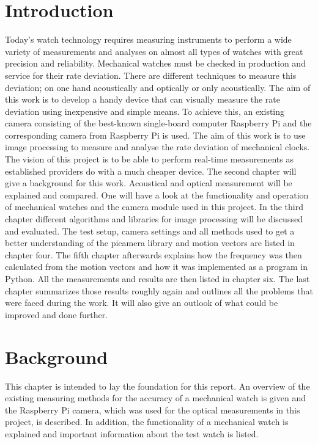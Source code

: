 \documentclass[12pt, a4paper]{report}
\begin{document}
\pagebreak
    \setcounter{secnumdepth}{5} 
    \setcounter{tocdepth}{5} 
    \tableofcontents
    \pagebreak
    
    \chapter{Introduction}
    Today's watch technology requires measuring instruments to perform a wide variety of measurements and analyses on almost all types of watches with great precision and reliability.
    Mechanical watches must be checked in production and service for their rate deviation.
    There are different techniques to measure this deviation; on one hand acoustically and optically or only acoustically.
    The aim of this work is to develop a handy device that can visually measure the rate deviation using inexpensive and simple means.
    To achieve this, an existing camera consisting of the best-known single-board computer Raspberry Pi and the corresponding camera from Raspberry Pi is used.
    The aim of this work is to use image processing to measure and analyse the rate deviation of mechanical clocks.
    The vision of this project is to be able to perform real-time measurements as established providers do with a much cheaper device. 
    \newline
    The second chapter will give a background for this work. Acoustical and optical measurement will be explained and compared. One will have a look at the functionality and operation of mechanical watches and the camera module used in this project.
    In the third chapter different algorithms and libraries for image processing will be discussed and evaluated. 
    The test setup, camera settings and all methods used to get a better understanding of the picamera library and motion vectors are listed in chapter four. 
    The fifth chapter afterwards explains how the frequency was then calculated from the motion vectors and how it was implemented as a program in Python. 
    All the measurements and results are then listed in chapter six. 
    The last chapter summarizes those results roughly again and outlines all the problems that were faced during the work. It will also give an outlook of what could be improved and done further.

    \chapter{Background}
    This chapter is intended to lay the foundation for this report. An overview of the existing measuring methods for the accuracy of a mechanical watch is given and the Raspberry Pi camera, which was used for the optical measurements in this project, is described. In addition, the functionality of a mechanical watch is explained and important information about the test watch is listed.
\end{document}
